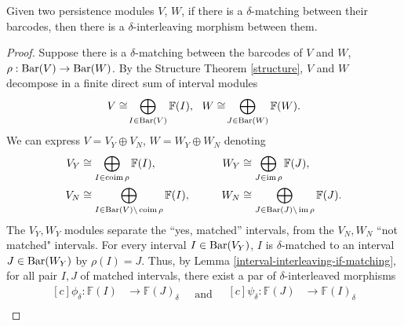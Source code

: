 \begin{proposition} \label{prop:interleaving-if-matching} %
    Given two persistence modules $ V $, $ W $, if there is a $ \delta$-matching between their barcodes, then there is a $ \delta$-interleaving morphism between them.
\end{proposition}
\begin{proof}
    Suppose there is a $\delta$-matching between the barcodes of $ V $ and $ W $, $\rho: \operatorname{Bar} (V) \to \operatorname{Bar} (W) $. By the Structure Theorem \ref{structure}, $ V $ and $ W $ decompose in a finite direct sum of interval modules
    $$
        V \cong \! \bigoplus_{I \in \operatorname{Bar} (V)} \mathbb F (I), \ \ W \cong \! \bigoplus_{J \in  \operatorname{Bar} (W)} \mathbb F (W) .
    $$
    We can express $ V = V_Y \oplus V_N $, $ W = W_Y \oplus W_N $ denoting
    \begin{equation*}
        \begin{aligned}[c]
        V_Y &\cong \bigoplus_{I \in  \operatorname{coim} \rho} \mathbb F (I),\\
        V_N &\cong \bigoplus_{I \in \operatorname{Bar}(V) \backslash \operatorname{coim} \rho} \mathbb F (I),\\
        \end{aligned}
        \quad \quad \quad
        \begin{aligned}[c]
        W_Y &\cong \bigoplus_{J \in  \operatorname{im} \rho} \mathbb F (J),\\
        W_N &\cong \bigoplus_{J \in \operatorname{Bar}(J) \backslash \operatorname{im} \rho} \mathbb F (J).
        \end{aligned}
    \end{equation*}
    The $ V_Y, W_Y $ modules separate the ``yes, matched'' intervals, from the $ V_N, W_N $ ``not matched" intervals. For every interval $ I \in \operatorname{Bar}(V_Y) $, $ I $ is $\delta$-matched to an interval $ J \in \operatorname{Bar}(W_Y)$ by $\rho(I) = J $. Thus, by Lemma \ref{interval-interleaving-if-matching}, for all pair $ I, J $ of matched intervals, there exist a par of $\delta$-interleaved morphisms
    \begin{equation*}
        \begin{aligned}[c]
        \phi_\delta: \mathbb F(I) &\to \mathbb F(J)_\delta\\
        \end{aligned}
        \quad \text{and} \quad
        \begin{aligned}[c]
        \psi_\delta: \mathbb F(J) &\to \mathbb F(I)_\delta\\
        \end{aligned}

\end{equation*}
\end{proof}
